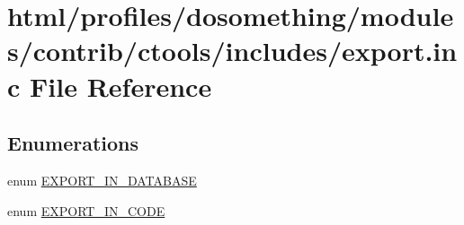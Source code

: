 \hypertarget{export_8inc}{
\section{html/profiles/dosomething/modules/contrib/ctools/includes/export.inc File Reference}
\label{export_8inc}
}
\subsection*{Enumerations}
\begin{DoxyCompactItemize}
\item 
enum \hyperlink{export_8inc_ae857242c63a79d0a31b4b9d0e2f90b37}{EXPORT\_\-IN\_\-DATABASE} 
\item 
enum \hyperlink{export_8inc_a998643927da0d2855502bbd259cc8734}{EXPORT\_\-IN\_\-CODE} 
\end{DoxyCompactItemize}
